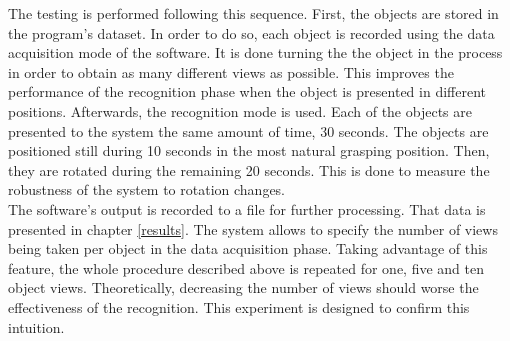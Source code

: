 		The testing is performed following this sequence. 
		First, the objects are stored in the program's dataset. 
		In order to do so, each object is recorded using the data acquisition mode of the software. 
		It is done turning the the object in the process in order to obtain as many different views as possible. 
		This improves the performance of the recognition phase when the object is presented in different positions. 
		Afterwards, the recognition mode is used.
		Each of the objects are presented to the system the same amount of time, 30 seconds. 
		The objects are positioned still during 10 seconds in the most natural grasping position. 
		Then, they are rotated during the remaining 20 seconds. 
		This is done to measure the robustness of the system to rotation changes. 
\\

		The software's output is recorded to a file for further processing. 
		That data is presented in chapter \ref{results}.
		The system allows to specify the number of views being taken per object in the data acquisition phase. 
		Taking advantage of this feature, the whole procedure described above is repeated for one, five and ten object views.
		Theoretically, decreasing the number of views should worse the effectiveness of the recognition. %
		This experiment is designed to confirm this intuition. 
		\\%






